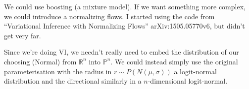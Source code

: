 \documentclass[11pt]{article}
\begin{document}
We could use boosting (a mixture model).
If we want something more complex, we could introduce a normalizing flows.
I started using the code from ``Variational Inference with Normalizing Flows'' arXiv:1505.05770v6, but didn't get very far.

Since we're doing VI, we needn't really need to embed the distribution of our choosing (Normal) from $\mathbb{R}^{n}$ into $\mathbb{P}^{n}$.
We could instead simply use the original parameterisation with the radius in $r \sim P(N(\mu, \sigma))$ a logit-normal distribution and the directional similarly in a $n$-dimensional logit-normal.
\end{document}
